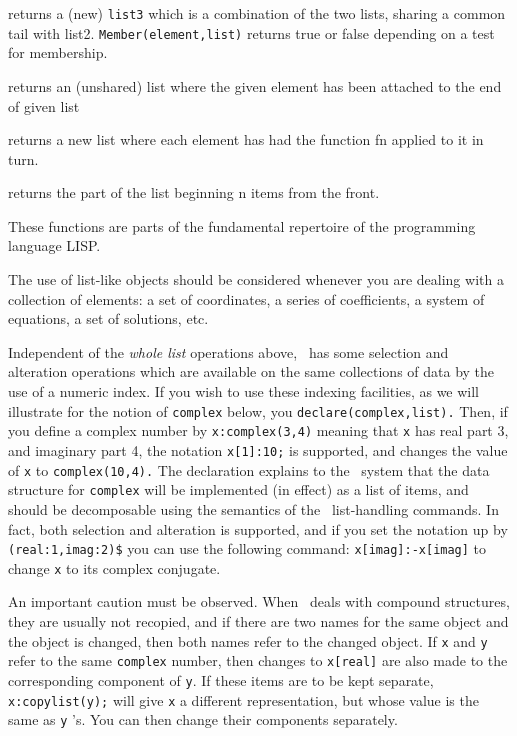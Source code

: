 returns a (new) {\tt list3} which is a
combination of the two lists, sharing a common tail with list2. 
{\tt Member(element,list)}
returns true or false depending on a test
for membership.

returns an (unshared) list where the given element has been
attached to the end of
given list

 returns a new list where each element
has had the function fn applied to it in turn.

 returns the part of the list beginning n items from
the front. 

These functions are parts of the fundamental repertoire of
the programming language LISP.

The use of list-like objects should be considered whenever you are
dealing with a collection of elements: a set of coordinates, a series
of coefficients, a system of equations, a set of solutions, etc.

Independent of the {\it whole list} operations above,
\Max\
has some selection and alteration operations which are available on
the same collections of data by the use of a numeric index.
If you wish to use these indexing facilities, as we will illustrate for the
notion of 
{\tt complex}
below, you {\tt declare(complex,list).}
Then, if you define a complex
number by {\tt x:complex(3,4)}
meaning that 
{\tt x}
has real part 3, and imaginary
part 4, the notation {\tt x[1]:10;}
is supported, and changes the value of
{\tt x}
to
{\tt complex(10,4).}
The declaration explains to the
\Max\
system that the data structure for
{\tt complex}
will be implemented (in effect) as a list of items, and should be decomposable
using the semantics of the
\Max\
list-handling commands.
In fact, both selection and alteration is supported, and if you set the
notation up by {\tt (real:1,imag:2)\$}
you can use the following command:
{\tt x[imag]:-x[imag]}
to change 
{\tt x}
to its complex conjugate.

An important caution must be observed.  When
\Max\
deals with compound structures, they are usually not recopied, and if
there are two names for the same object and the object is changed, then
both names refer to the changed object.
If {\tt x} and {\tt y} refer to the same {\tt complex} number, then changes to
{\tt x[real]} are also made to the corresponding component of {\tt y}.
If these items are to be kept separate, {\tt x:copylist(y);} will give {\tt x}
a different representation, but whose value is the same as {\tt y} 's.
You can then change their components separately.

